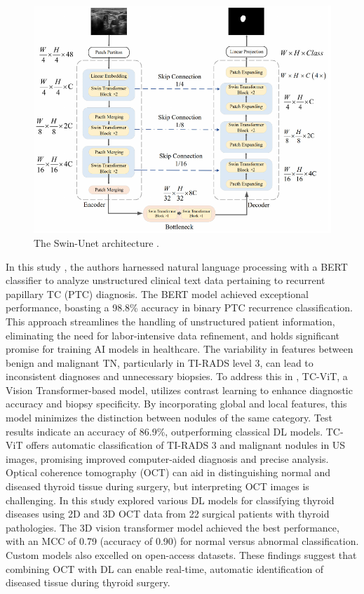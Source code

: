 \documentclass[a4paper,fleqn]{cas-sc}
\begin{document}
\begin{figure}[t!]
\centering
\includegraphics[width=0.9\columnwidth]{fig9.pdf}
\caption{ The Swin-Unet architecture \cite{ma2023amseg}.}
\label{fig9}
\end{figure}

In this study \cite{nam2023bert}, the authors harnessed natural language processing with a \ac{BERT} classifier  to analyze unstructured clinical text data pertaining to recurrent papillary \ac{TC} (PTC) diagnosis. The \ac{BERT} model achieved exceptional performance, boasting a 98.8\% accuracy in binary PTC recurrence classification. This approach streamlines the handling of unstructured patient information, eliminating the need for labor-intensive data refinement, and holds significant promise for training \ac{AI} models in healthcare. The variability in features between benign and malignant \ac{TN}, particularly in TI-RADS level 3, can lead to inconsistent diagnoses and unnecessary biopsies. To address this in \cite{sun2023classification}, TC-ViT, a Vision Transformer-based model, utilizes contrast learning to enhance diagnostic accuracy and biopsy specificity. By incorporating global and local features, this model minimizes the distinction between nodules of the same category. Test results indicate an accuracy of 86.9\%, outperforming classical \ac{DL} models. TC-ViT offers automatic classification of TI-RADS 3 and malignant nodules in \ac{US} images, promising improved computer-aided diagnosis and precise analysis. Optical coherence tomography (OCT) can aid in distinguishing normal and diseased thyroid tissue during surgery, but interpreting OCT images is challenging. In this study \cite{tampu2023diseased} explored various \ac{DL} models for classifying thyroid diseases using 2D and 3D OCT data from 22 surgical patients with thyroid pathologies. The 3D vision transformer model achieved the best performance, with an MCC of 0.79 (accuracy of 0.90) for normal versus abnormal classification. Custom models also excelled on open-access datasets. These findings suggest that combining OCT with \ac{DL} can enable real-time, automatic identification of diseased tissue during thyroid surgery.
\end{document}

